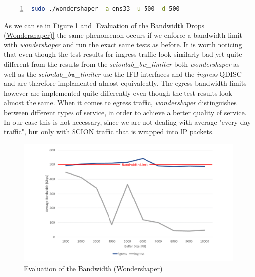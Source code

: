 \begin{lstlisting}[language=sh, caption = Wondershaper command, captionpos=b, numbers=left, frame=single, breaklines=true, breakatwhitespace=true, showstringspaces=false, label=Wondershaper command]
sudo ./wondershaper -a ens33 -u 500 -d 500
\end{lstlisting}

As we can se in Figure \ref{Evaluation of the Bandwidth (Wondershaper)} and \ref{Evaluation of the Bandwidth Drops (Wondershaper)} the same phenomenon occurs if we enforce a bandwidth limit with \textit{wondershaper} and run the exact same tests as before. It is worth noticing that even though the test results for ingress traffic look similarly bad yet quite different from the results from the \textit{scionlab\_bw\_limiter} both \textit{wondershaper} as well as the \textit{scionlab\_bw\_limiter} use the \ac{IFB} interfaces and the \textit{ingress} \acs{QDISC} and are therefore implemented almost equivalently. The egress bandwidth limits however are implemented quite differently even though the test results look almost the same. When it comes to egress traffic, \textit{wondershaper} distinguishes between different types of service, in order to achieve a better quality of service. In our case this is not necessary, since we are not dealing with average "every day traffic", but only with \acs{SCION} traffic that is wrapped into \acs{IP} packets.  

\begin{figure}[h]
	\centering
	\includegraphics[width=\textwidth]{img/Evaluation-Bandwidth-Wondershaper.png}
	\caption{Evaluation of the Bandwidth (Wondershaper)}
	\label{Evaluation of the Bandwidth (Wondershaper)}
\end{figure}

